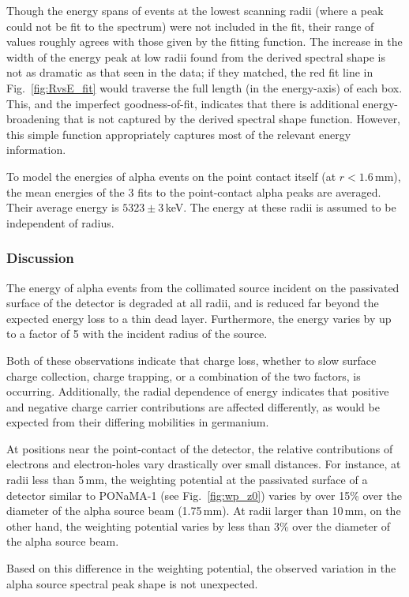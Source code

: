 \documentclass[groupedaddress,rmp,amsmath,amssymb,bibnotes,altaffilletter,twocolumn]{revtex4-1}
\begin{document}
Though the energy spans of events at the lowest scanning radii (where a peak could not be fit to the spectrum) were not included in the fit, their range of values roughly agrees with those given by the fitting function. The increase in the width of the energy peak at low radii found from the derived spectral shape is not as dramatic as that seen in the data; if they matched, the red fit line in Fig.~\ref{fig:RvsE_fit} would traverse the full length (in the energy-axis) of each box. This, and the imperfect goodness-of-fit, indicates that there is additional energy-broadening that is not captured by the derived spectral shape function. However, this simple function appropriately captures most of the relevant energy information. 

To model the energies of alpha events on the point contact itself (at $r<1.6$\,mm), the mean energies of the 3 fits to the point-contact alpha peaks are averaged. Their average energy is $5323\pm3$\,keV. The energy at these radii is assumed to be independent of radius. 

\subsubsection{Discussion}
The energy of alpha events from the collimated source incident on the passivated surface of the detector is degraded at all radii, and is reduced far beyond the expected energy loss to a thin dead layer. Furthermore, the energy varies by up to a factor of 5 with the incident radius of the source. 

Both of these observations indicate that charge loss, whether to slow surface charge collection, charge trapping, or a combination of the two factors, is occurring. Additionally, the radial dependence of energy indicates that positive and negative charge carrier contributions are affected differently, as would be expected from their differing mobilities in germanium.

At positions near the point-contact of the detector, the relative contributions of electrons and electron-holes vary drastically over small distances. For instance, at radii less than 5\,mm, the weighting potential at the passivated surface of a detector similar to PONaMA-1 (see Fig.~\ref{fig:wp_z0}) varies by over 15\% over the diameter of the alpha source beam (1.75\,mm). At radii larger than 10\,mm, on the other hand, the weighting potential varies by less than 3\% over the diameter of the alpha source beam. 

Based on this difference in the weighting potential, the observed variation in the alpha source spectral peak shape is not unexpected. 
\end{document}
